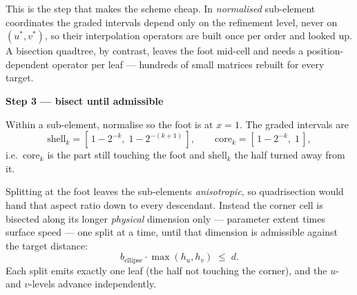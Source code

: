 \documentclass[11pt]{article}
\newcommand{\stepbox}[1]{%
  \par\medskip\noindent\textbf{\color{cElem}#1}\par\nopagebreak\smallskip}
\begin{document}
This is the step that makes the scheme cheap. In \emph{normalised} sub-element coordinates the
graded intervals depend only on the refinement level, never on $(u^\ast,v^\ast)$, so their
interpolation operators are built once per order and looked up. A bisection quadtree, by
contrast, leaves the foot mid-cell and needs a position-dependent operator per leaf --- hundreds
of small matrices rebuilt for every target.

\stepbox{Step 3 --- bisect until admissible}

Within a sub-element, normalise so the foot is at $x=1$. The graded intervals are
\[
  \text{shell}_k = [\,1-2^{-k},\; 1-2^{-(k+1)}\,], \qquad
  \text{core}_k  = [\,1-2^{-k},\; 1\,],
\]
i.e.\ $\text{core}_k$ is the part still touching the foot and $\text{shell}_k$ the half turned away
from it.

Splitting at the foot leaves the sub-elements \emph{anisotropic}, so quadrisection would hand that
aspect ratio down to every descendant. Instead the corner cell is bisected along its longer
\emph{physical} dimension only --- parameter extent times surface speed --- one split at a time,
until that dimension is admissible against the target distance:
\[
  b_{\text{ellipse}}\cdot\max(h_u,h_v) \;\le\; d .
\]
Each split emits exactly one leaf (the half not touching the corner), and the $u$- and
$v$-levels advance independently.

\begin{center}
\begin{minipage}{\textwidth}\centering
{}
\end{minipage}
\end{center}
\end{document}
